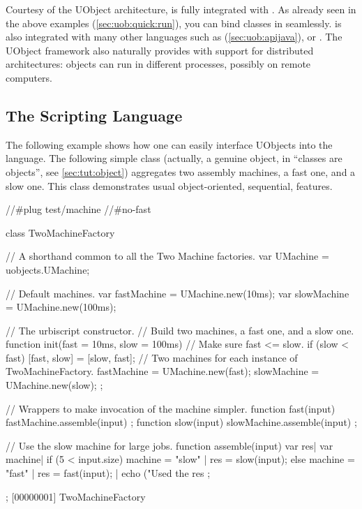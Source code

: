 Courtesy of the UObject architecture, \us is fully integrated with \Cxx. As
already seen in the above examples (\autoref{sec:uob:quick:run}), you can
bind \Cxx classes in \us seamlessly. \us is also integrated with many other
languages such as \Java (\autoref{sec:uob:apijava}), \MatLab or \Python.
The UObject framework also naturally provides \us with support for
distributed architectures: objects can run in different processes, possibly
on remote computers.

\subsection{The \us Scripting Language}

The following example shows how one can easily interface UObjects into the
\us language.  The following simple class (actually, a genuine object, in
\us ``classes are objects'', see \autoref{sec:tut:object}) aggregates two
assembly machines, a fast one, and a slow one.  This class demonstrates
usual object-oriented, sequential, features.

\begin{urbicomment}
//#plug test/machine
//#no-fast
\end{urbicomment}
\begin{urbiscript}
class TwoMachineFactory
{
  // A shorthand common to all the Two Machine factories.
  var UMachine = uobjects.UMachine;

  // Default machines.
  var fastMachine = UMachine.new(10ms);
  var slowMachine = UMachine.new(100ms);

  // The urbiscript constructor.
  // Build two machines, a fast one, and a slow one.
  function init(fast = 10ms, slow = 100ms)
  {
    // Make sure fast <= slow.
    if (slow < fast)
      [fast, slow] = [slow, fast];
    // Two machines for each instance of TwoMachineFactory.
    fastMachine = UMachine.new(fast);
    slowMachine = UMachine.new(slow);
  };

  // Wrappers to make invocation of the machine simpler.
  function fast(input) { fastMachine.assemble(input) };
  function slow(input) { slowMachine.assemble(input) };

  // Use the slow machine for large jobs.
  function assemble(input)
  {
    var res|
    var machine|
    if (5 < input.size)
      { machine = "slow" | res = slow(input); }
    else
      { machine = "fast" | res = fast(input); } |
    echo ("Used the %
    res
  };
};
[00000001] TwoMachineFactory
\end{urbiscript}

